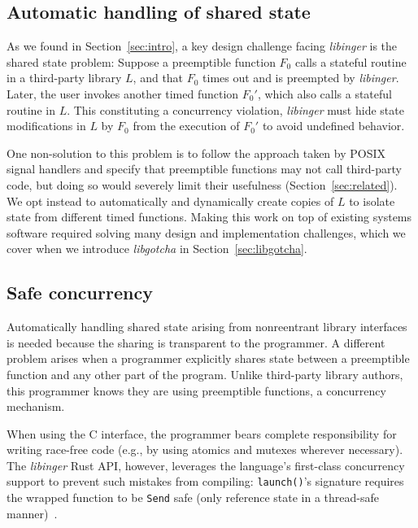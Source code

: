 

\subsection{Automatic handling of shared state}
\label{sec:libinger:reentrancy}

As we found in Section~\ref{sec:intro}, a key design challenge facing
\textit{libinger} is the shared state problem:  Suppose a preemptible function
$F_0$ calls a stateful routine in a third-party library $L$, and
that $F_0$ times out and is preempted by \textit{libinger}.  Later, the
user invokes another timed function $F_0'$, which also calls a stateful
routine in $L$.  This constituting a concurrency violation,
\textit{libinger} must hide state modifications in $L$ by $F_0$
from the execution of $F_0'$ to avoid undefined behavior.

One non-solution to this problem is to follow the approach taken by POSIX signal
handlers and specify that preemptible functions may not
call third-party code, but doing so would
severely limit their usefulness (Section~\ref{sec:related}).  We opt instead
to automatically and dynamically create copies of $L$ to
isolate state from different timed functions.  Making this work on top of
existing systems software required solving many
design and implementation challenges, which we cover when we introduce
\textit{libgotcha} in Section~\ref{sec:libgotcha}.


\subsection{Safe concurrency}
\label{sec:libinger:concurrency}

Automatically handling shared state arising from nonreentrant library interfaces is
needed because the sharing is transparent to the programmer.  A
different problem arises when a programmer explicitly shares state between a
preemptible function and any other part of the program.  Unlike third-party library
authors, this programmer knows they are using preemptible functions, a
concurrency mechanism.

When using the C interface, the programmer bears complete responsibility for writing
race-free code (e.g., by using atomics and mutexes wherever necessary).
The \textit{libinger} Rust API, however, leverages the
language's first-class concurrency support to prevent such mistakes from compiling:\@
\texttt{launch()}'s signature requires the wrapped function to be \texttt{Send} safe
(only reference state in a thread-safe manner)~\cite{www-rustlang-conc}.

